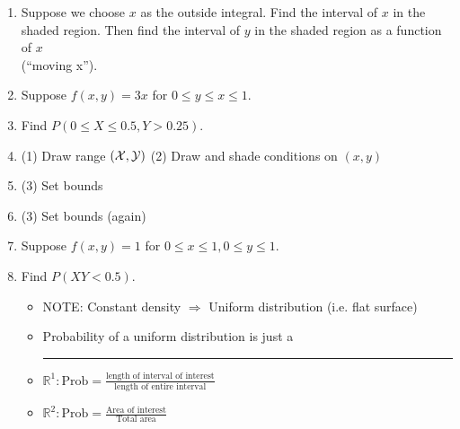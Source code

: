 \documentclass{article}
\newcommand{\blankul}[1]{\rule[-1.5mm]{#1}{0.15mm}}	%
\begin{document}
\begin{itemize}
\begin{enumerate}[1)]
        \item[] Suppose we choose $x$ as the outside integral. Find the interval of $x$ in the shaded region. Then find the interval of $y$ in the shaded region as a function of $x$ \\(``moving x'').
    \end{enumerate}
    \newpage
    \begin{enumerate}\setcounter{enumi}{1}%
        \item Suppose $f(x,y) = 3x$ \quad for $0 \le y \le x \le 1$.
        \item[] Find $P(0 \le X \le 0.5, Y > 0.25)$.
        \item[] (1) Draw range $(\cal{X},\cal{Y})$ \hfill (2) Draw and shade conditions on $(x,y)$\vspace{195pt}
        \item[] (3) Set bounds\vspace{195pt}
        \item[] (3) Set bounds (again)\vspace{195pt}
        \item Suppose $f(x,y) = 1$ \quad for $0 \le x \le 1, 0 \le y \le 1$.
        \item[] Find $P(XY < 0.5)$.
        \begin{itemize}
            \item NOTE: Constant density  $\Longrightarrow$ Uniform distribution (i.e. flat surface)
            \item[] Probability of a uniform distribution is just a \blankul{3cm}
            \item[] $\mathbb{R}^1: \text{Prob} = \frac{\text{length of interval of interest}}{\text{length of entire interval}}$
            \item[] $\mathbb{R}^2: \text{Prob} = \frac{\text{Area of interest}}{\text{Total area}}$
        \end{itemize}\newpage
    \end{enumerate}
\end{itemize}\bigskip
\end{document}
